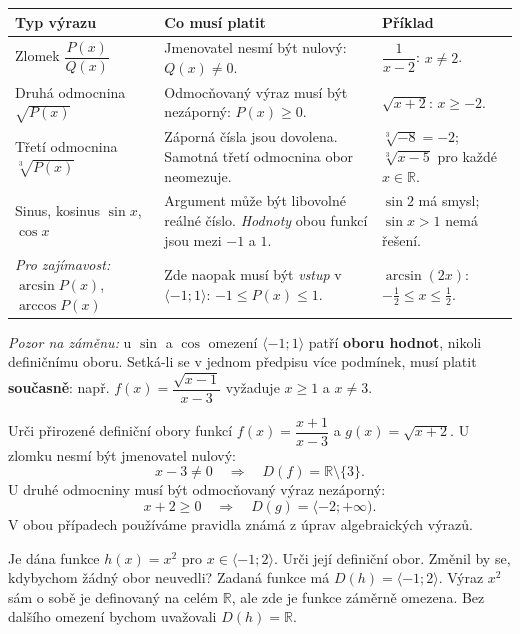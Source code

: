 \documentclass[11pt,a4paper]{article}
\begin{document}
\begingroup
\small
\renewcommand{\arraystretch}{1.28}
\begin{tabularx}{\linewidth}{@{}>{\raggedright\arraybackslash}p{.205\linewidth}>{\raggedright\arraybackslash}p{.345\linewidth}X@{}}
\toprule
\textbf{Typ výrazu} & \textbf{Co musí platit} & \textbf{Příklad}\\
\midrule
Zlomek $\dfrac{P(x)}{Q(x)}$
& Jmenovatel nesmí být nulový: $Q(x)\ne0$.
& $\dfrac1{x-2}$: $x\ne2$.\\
Druhá odmocnina $\sqrt{P(x)}$
& Odmocňovaný výraz musí být nezáporný: $P(x)\ge0$.
& $\sqrt{x+2}$: $x\ge-2$.\\
Třetí odmocnina $\sqrt[3]{P(x)}$
& Záporná čísla jsou dovolena. Samotná třetí odmocnina obor neomezuje.
& $\sqrt[3]{-8}=-2$; $\sqrt[3]{x-5}$ pro každé $x\in\mathbb R$.\\
Sinus, kosinus $\sin x$, $\cos x$
& Argument může být libovolné reálné číslo. \emph{Hodnoty} obou funkcí jsou mezi $-1$ a $1$.
& $\sin 2$ má smysl; $\sin x>1$ nemá řešení.\\
\emph{Pro zajímavost:} $\arcsin P(x)$, $\arccos P(x)$
& Zde naopak musí být \emph{vstup} v $\langle-1;1\rangle$:
$-1\le P(x)\le1$.
& $\arcsin(2x)$: $-\frac12\le x\le\frac12$.\\
\bottomrule
\end{tabularx}
\endgroup

\emph{Pozor na záměnu:} u $\sin$ a $\cos$ omezení $\langle-1;1\rangle$
patří \textbf{oboru hodnot}, nikoli definičnímu oboru. Setká-li se
v jednom předpisu více podmínek, musí platit \textbf{současně}:
např. $f(x)=\dfrac{\sqrt{x-1}}{x-3}$ vyžaduje $x\ge1$ a $x\ne3$.


\begin{prikladReseniBox}[title={Příklad 1}]
Urči přirozené definiční obory funkcí
$f(x)=\dfrac{x+1}{x-3}$ a $g(x)=\sqrt{x+2}$.
\tcblower
U zlomku nesmí být jmenovatel nulový:
\[
x-3\ne0\quad\Longrightarrow\quad
D(f)=\mathbb R\setminus\{3\}.
\]
U druhé odmocniny musí být odmocňovaný výraz nezáporný:
\[
x+2\ge0\quad\Longrightarrow\quad
D(g)=\langle-2;+\infty).
\]
V obou případech používáme pravidla známá z úprav algebraických výrazů.
\end{prikladReseniBox}

\begin{prikladReseniBox}[title={Příklad 2}]
Je dána funkce $h(x)=x^2$ pro $x\in\langle-1;2\rangle$.
Urči její definiční obor. Změnil by se, kdybychom žádný obor neuvedli?
\tcblower
Zadaná funkce má $D(h)=\langle-1;2\rangle$. Výraz $x^2$
sám o sobě je definovaný na celém $\mathbb R$, ale zde je funkce
záměrně omezena. Bez dalšího omezení bychom uvažovali
$D(h)=\mathbb R$.
\end{prikladReseniBox}
\end{document}
